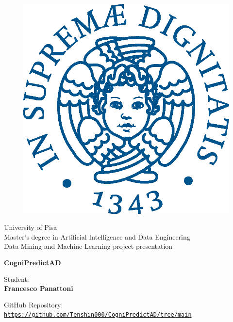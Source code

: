 \begin{titlepage}
\begin{figure}[!htb]
    \centering
    \includegraphics[keepaspectratio=true,scale=0.5]{images/Frontespizio/cherubinFrontespizio.eps}
\end{figure}

\vspace{5mm}

\begin{center}
    \LARGE{University of Pisa}
    \vspace{8mm}
    \\ \LARGE{Master’s degree in Artificial Intelligence and Data Engineering}
    \vspace{8mm}
    \\ \LARGE{Data Mining and Machine Learning project presentation}
\end{center}

\vspace{10mm}

\begin{center}
    {\LARGE{\bf CogniPredictAD}}
\end{center}

\vspace{30mm}

\begin{minipage}[t]{0.47\textwidth}
	{\large{Student:}{\normalsize\vspace{3mm} \bf\\ \large{Francesco Panattoni}}}
\end{minipage}

\vspace{20mm}

\begin{center}
	GitHub Repository: \href{https://github.com/Tenshin000/CogniPredictAD/tree/main}{\texttt{https://github.com/Tenshin000/CogniPredictAD/tree/main}}
\end{center}


\vspace{20mm}

\hrulefill
\\

\end{titlepage}
